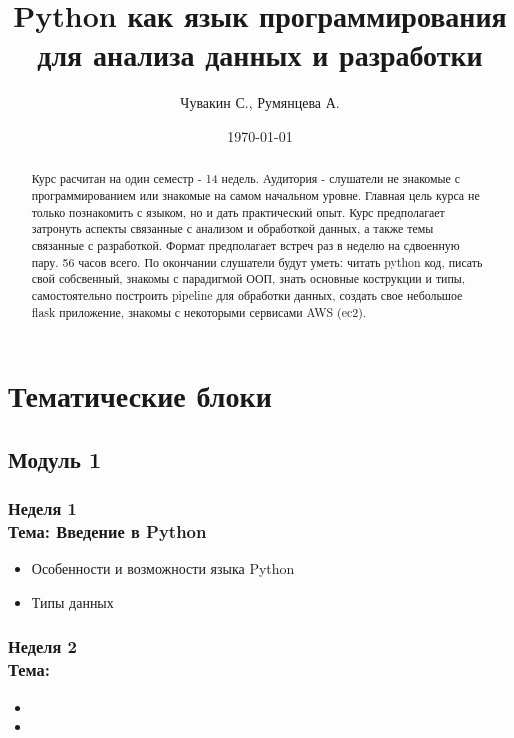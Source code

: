\documentclass[a4paper,11pt]{article}
\author{Чувакин С., Румянцева А.}
\title{Python как язык программирования для анализа данных и разработки}
\date{\today}
\begin{document}
\renewcommand{\abstractname}{Концепция} %

\maketitle

\begin{abstract}
     Курс расчитан на один семестр - 14 недель. Аудитория - слушатели не знакомые с программированием или знакомые на самом начальном уровне. Главная цель курса не только познакомить с языком, но и дать практический опыт. Курс предполагает затронуть аспекты связанные с анализом и обработкой данных, а также темы связанные с разработкой. Формат предполагает встреч раз в неделю на сдвоенную пару. 56 часов всего. По окончании слушатели будут уметь: читать python код, писать свой собсвенный, знакомы с парадигмой ООП, знать основные кострукции и типы, самостоятельно построить pipeline для обработки данных, создать свое небольшое flask приложение, знакомы с некоторыми сервисами AWS (ec2).
\end{abstract}

\section{Тематические блоки}

\subsection{Модуль 1}

\subsubsection{Неделя 1\\ Тема: Введение в Python}

\begin{itemize}
    \item  Особенности и возможности языка Python
    \item  Типы данных
\end{itemize}

\subsubsection{Неделя 2\\ Тема: }

\begin{itemize}
    \item 
    \item 
\end{itemize}
\end{document}
